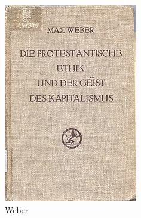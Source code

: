 \documentclass[a4paper,10pt]{book}
\begin{document}
\begin{figure}[ht!]
    \centering
    \begin{subfigure}[b]{0.25\textwidth}
    \centering
    \includegraphics[width=\linewidth]{static/weber}
    \caption{Weber}
    \label{}
    \end{subfigure}
    \begin{subfigure}[b]{0.25\textwidth}
    \centering

\end{subfigure}
\end{figure}
\end{document}
